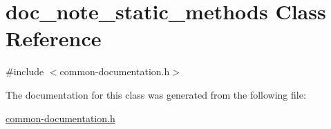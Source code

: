 \hypertarget{classdoc__note__static__methods}{}\section{doc\+\_\+note\+\_\+static\+\_\+methods Class Reference}
\label{classdoc__note__static__methods}


{\ttfamily \#include $<$common-\/documentation.\+h$>$}



The documentation for this class was generated from the following file\+:\begin{DoxyCompactItemize}
\item 
\hyperlink{common-documentation_8h}{common-\/documentation.\+h}\end{DoxyCompactItemize}
